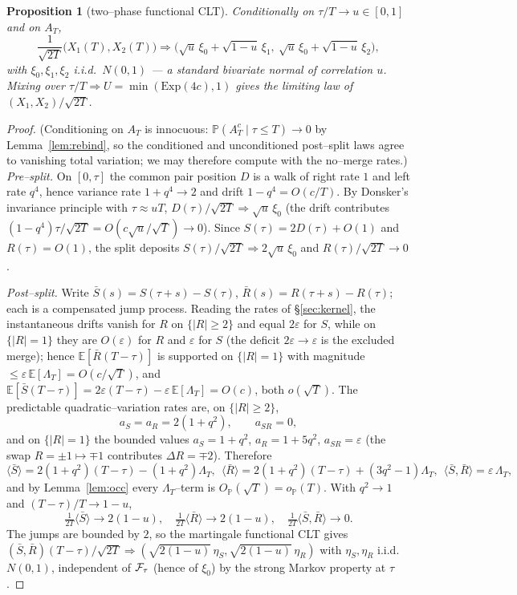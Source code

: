 \documentclass[11pt]{article}
\theoremstyle{plain}
\newtheorem{proposition}[theorem]{Proposition}
\theoremstyle{definition}
\theoremstyle{remark}
\newcommand{\E}{\mathbb{E}}\newcommand{\PP}{\mathbb{P}}\newcommand{\dd}{\,\mathrm{d}}
\newcommand{\To}{\Rightarrow}\newcommand{\so}{\mathfrak{so}}
\newcommand{\eps}{\varepsilon}\newcommand{\Exp}{\mathrm{Exp}}
\begin{document}
\begin{proposition}[two--phase functional CLT]\label{prop:twophase}
Conditionally on $\tau/T\to u\in[0,1]$ and on $A_T$,
\[
  \frac1{\sqrt{2T}}\big(X_1(T),X_2(T)\big)\To
  \big(\sqrt u\,\xi_0+\sqrt{1-u}\,\xi_1,\ \sqrt u\,\xi_0+\sqrt{1-u}\,\xi_2\big),
\]
with $\xi_0,\xi_1,\xi_2$ i.i.d.\ $N(0,1)$ --- a standard bivariate normal of correlation
$u$. Mixing over $\tau/T\To U=\min(\Exp(4c),1)$ gives the limiting law of
$(X_1,X_2)/\sqrt{2T}$.
\end{proposition}
\begin{proof}
(Conditioning on $A_T$ is innocuous: $\PP(A_T^c\mid\tau\le T)\to0$ by
Lemma~\ref{lem:rebind}, so the conditioned and unconditioned post--split laws agree
to vanishing total variation; we may therefore compute with the no--merge rates.)
\emph{Pre--split.} On $[0,\tau]$ the common pair position $D$ is a walk of right rate
$1$ and left rate $q^4$, hence variance rate $1+q^4\to2$ and drift $1-q^4=O(c/T)$. By
Donsker's invariance principle with $\tau\approx uT$, $D(\tau)/\sqrt{2T}\To\sqrt u\,\xi_0$
(the drift contributes $(1-q^4)\tau/\sqrt{2T}=O(c\sqrt u/\sqrt T)\to0$). Since
$S(\tau)=2D(\tau)+O(1)$ and $R(\tau)=O(1)$, the split deposits
$S(\tau)/\sqrt{2T}\To2\sqrt u\,\xi_0$ and $R(\tau)/\sqrt{2T}\to0$.

\emph{Post--split.} Write $\bar S(s)=S(\tau{+}s)-S(\tau)$, $\bar R(s)=R(\tau{+}s)-R(\tau)$;
each is a compensated jump process. Reading the rates of \S\ref{sec:kernel}, the
instantaneous drifts vanish for $R$ on $\{|R|\ge2\}$ and equal $2\eps$ for $S$, while on
$\{|R|=1\}$ they are $O(\eps)$ for $R$ and $\eps$ for $S$ (the deficit $2\eps\to\eps$ is
the excluded merge); hence $\E[\bar R(T{-}\tau)]$ is supported on $\{|R|=1\}$ with
magnitude $\le\eps\,\E[\Lambda_T]=O(c/\sqrt T)$, and
$\E[\bar S(T{-}\tau)]=2\eps(T{-}\tau)-\eps\,\E[\Lambda_T]=O(c)$, both $o(\sqrt T)$. The
predictable quadratic--variation rates are, on $\{|R|\ge2\}$,
\[
  a_S=a_R=2(1+q^2),\qquad a_{SR}=0,
\]
and on $\{|R|=1\}$ the bounded values $a_S=1+q^2$, $a_R=1+5q^2$, $a_{SR}=\eps$ (the swap
$R=\pm1\mapsto\mp1$ contributes $\Delta R=\mp2$). Therefore
\[
  \langle\bar S\rangle=2(1+q^2)(T{-}\tau)-(1+q^2)\Lambda_T,\ \
  \langle\bar R\rangle=2(1+q^2)(T{-}\tau)+(3q^2{-}1)\Lambda_T,\ \
  \langle\bar S,\bar R\rangle=\eps\,\Lambda_T,
\]
and by Lemma~\ref{lem:occ} every $\Lambda_T$--term is $O_\PP(\sqrt T)=o_\PP(T)$. With
$q^2\to1$ and $(T{-}\tau)/T\to1-u$,
\[
  \tfrac1{2T}\langle\bar S\rangle\to2(1-u),\quad
  \tfrac1{2T}\langle\bar R\rangle\to2(1-u),\quad
  \tfrac1{2T}\langle\bar S,\bar R\rangle\to0.
\]
The jumps are bounded by $2$, so the martingale functional CLT
\cite[Thm.~7.1.4]{EK} gives $(\bar S,\bar R)(T{-}\tau)/\sqrt{2T}\To
(\sqrt{2(1-u)}\,\eta_S,\sqrt{2(1-u)}\,\eta_R)$ with $\eta_S,\eta_R$ i.i.d.\ $N(0,1)$,
independent of $\mathcal F_\tau$ (hence of $\xi_0$) by the strong Markov property at $\tau$.


\end{proof}
\end{document}
